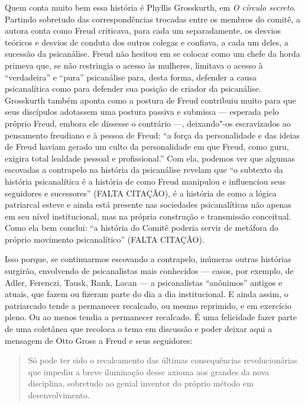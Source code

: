 Quem conta muito bem essa história é Phyllis Grosskurth, em \emph{O
círculo secreto}. Partindo sobretudo das correspondências trocadas
entre os membros do comitê, a autora conta como Freud criticava, para
cada um separadamente, os desvios teóricos e desvios de conduta dos
outros colegas e confiava, a cada um deles, a sucessão da psicanálise.
Freud não hesitou em se colocar como um chefe da horda primeva que, se
não restringia o acesso às mulheres, limitava o acesso à ``verdadeira''
e ``pura'' psicanálise para, desta forma, defender a causa psicanalítica
como para defender sua posição de criador da psicanálise. Grosskurth
também aponta como a postura de Freud contribuiu muito para que seus
discípulos adotassem uma postura passiva e submissa --- esperada pelo
próprio Freud, embora ele dissesse o contrário ---, deixando"-os
escravizados ao pensamento freudiano e à pessoa de Freud: ``a força da
personalidade e das ideias de Freud haviam gerado um culto da
personalidade em que Freud, como guru, exigira total lealdade pessoal e
profissional.'' Com ela, podemos ver que algumas escovadas a contrapelo
na história da psicanálise revelam que ``o subtexto da história
psicanalítica é a história de como Freud manipulou e influenciou seus
seguidores e sucessores'' (FALTA CITAÇÃO), é a história de como a lógica
patriarcal esteve e ainda está presente nas sociedades psicanalíticas
não apenas em seu nível institucional, mas na própria construção e
transmissão conceitual. Como ela bem conclui: ``a história do Comitê
poderia servir de metáfora do próprio movimento psicanalítico''
(FALTA CITAÇÃO).

Isso porque, se continuarmos escovando a contrapelo, inúmeras outras
histórias surgirão, envolvendo de psicanalistas mais conhecidos ---
casos, por exemplo, de Adler, Ferenczi, Tausk, Rank, Lacan --- a
psicanalistas ``anônimos'' antigos e atuais, que fazem ou fizeram parte
do dia a dia institucional. E ainda assim, o patriarcado tende a
permanecer recalcado, ou mesmo reprimido, e em exercício pleno. Ou ao
menos tendia a permanecer recalcado. É uma felicidade fazer parte de uma
coletânea que recoloca o tema em discussão e poder deixar aqui a
mensagem de Otto Gross a Freud e seus seguidores:

\begin{quote}
Só pode ter sido o recalcamento das últimas consequências
revolucionárias que impediu a breve iluminação desse axioma aos grandes
da nova disciplina, sobretudo ao genial inventor do próprio método em
desenvolvimento.
\end{quote}

